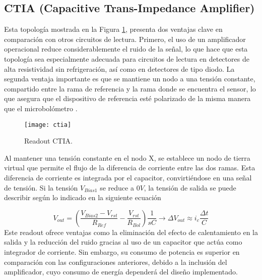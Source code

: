 \subsection{CTIA (Capacitive Trans-Impedance Amplifier)}

Esta topología mostrada en la Figura \ref{fig:ctia}, presenta dos ventajas clave en comparación con otros circuitos de lectura. Primero, el uso de un amplificador operacional reduce considerablemente el ruido de la señal, lo que hace que esta topología sea especialmente adecuada para circuitos de lectura en detectores de alta resistividad sin refrigeración, así como en detectores de tipo diodo. La segunda ventaja importante es que se mantiene un nodo a una tensión constante, compartido entre la rama de referencia y la rama donde se encuentra el sensor, lo que asegura que el dispositivo de referencia esté polarizado de la misma manera que el microbolómetro \cite{BlancoMDA}.

            \begin{figure}[hbtp]
                \centering
                \texttt{[image: ctia]}
                \caption{Readout CTIA.}
                \label{fig:ctia}
            \end{figure}

Al mantener una tensión constante en el nodo X, se establece un nodo de tierra virtual que permite el flujo de la diferencia de corriente entre las dos ramas. Esta diferencia de corriente es integrada por el capacitor, convirtiéndose en una señal de tensión. Si la tensión $V_{Bias1}$ se reduce a $0V$, la tensión de salida se puede describir según lo indicado en la siguiente ecuación \cite{BlancoMDA}

        \begin{equation}
        V_{out} =\left(\frac{V_{Bias2}-V_{rst}}{R_{Ref}}-\frac{V_{rst}}{R_{Bol}}\right) \frac{1}{sC} \to \Delta V_{out} \approx i_{c}\frac{\Delta t}{C}
        \label{eq:ctia}
        \end{equation}
Este readout ofrece ventajas como la eliminación del efecto de calentamiento en la salida y la reducción del ruido gracias al uso de un capacitor que actúa como integrador de corriente. Sin embargo, su consumo de potencia es superior en comparación con las configuraciones anteriores, debido a la inclusión del amplificador, cuyo consumo de energía dependerá del diseño implementado.

